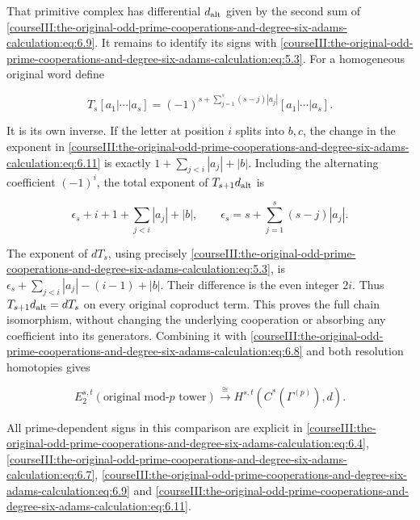 That primitive complex has differential \(d_{\rm alt}\) given by the second sum of \eqref{courseIII:the-original-odd-prime-cooperations-and-degree-six-adams-calculation:eq:6.9}. It remains to identify its signs with \eqref{courseIII:the-original-odd-prime-cooperations-and-degree-six-adams-calculation:eq:5.3}. For a homogeneous original word define

\begin{equation}
T_s[a_1|\cdots|a_s]
  =(-1)^{s+\sum_{j=1}^s(s-j)|a_j|}[a_1|\cdots|a_s].
 \label{courseIII:the-original-odd-prime-cooperations-and-degree-six-adams-calculation:eq:6.11}
\end{equation}

It is its own inverse. If the letter at position \(i\) splits into \(b,c\), the change in the exponent in \eqref{courseIII:the-original-odd-prime-cooperations-and-degree-six-adams-calculation:eq:6.11} is exactly
\(1+\sum_{j<i}|a_j|+|b|\).
Including the alternating coefficient \((-1)^i\), the total exponent of \(T_{s+1}d_{\rm alt}\) is

\[
 \epsilon_s+i+1+\sum_{j<i}|a_j|+|b|,
 \qquad \epsilon_s=s+\sum_{j=1}^s(s-j)|a_j|.
\]

The exponent of \(dT_s\), using precisely \eqref{courseIII:the-original-odd-prime-cooperations-and-degree-six-adams-calculation:eq:5.3}, is
\(\epsilon_s+\sum_{j<i}|a_j|-(i-1)+|b|\).
Their difference is the even integer \(2i\). Thus \(T_{s+1}d_{\rm alt}=dT_s\) on every original coproduct term. This proves the full chain isomorphism, without changing the underlying cooperation or absorbing any coefficient into its generators. Combining it with \eqref{courseIII:the-original-odd-prime-cooperations-and-degree-six-adams-calculation:eq:6.8} and both resolution homotopies gives

\begin{equation}
E_2^{s,t}(\text{original mod-}p\text{ tower})
 \xrightarrow{\cong}H^{s,t}(C^*(\Gamma^{(p)}),d).
 \label{courseIII:the-original-odd-prime-cooperations-and-degree-six-adams-calculation:eq:6.12}
\end{equation}

All prime-dependent signs in this comparison are explicit in \eqref{courseIII:the-original-odd-prime-cooperations-and-degree-six-adams-calculation:eq:6.4}, \eqref{courseIII:the-original-odd-prime-cooperations-and-degree-six-adams-calculation:eq:6.7}, \eqref{courseIII:the-original-odd-prime-cooperations-and-degree-six-adams-calculation:eq:6.9} and \eqref{courseIII:the-original-odd-prime-cooperations-and-degree-six-adams-calculation:eq:6.11}.

